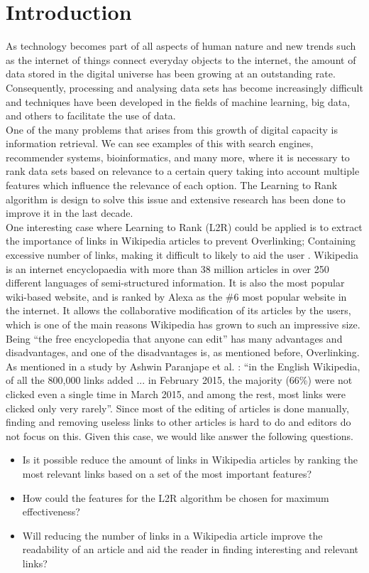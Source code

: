 \section{Introduction}

As technology becomes part of all aspects of human nature and new trends such as the internet of things connect everyday objects to the internet, the amount of data stored in the digital universe has been growing at an outstanding rate. Consequently, processing and analysing data sets has become increasingly difficult and techniques have been developed in the fields of machine learning, big data, and others to facilitate the use of data. \\
One of the many problems that arises from this growth of digital capacity is information retrieval. We can see examples of this with search engines, recommender systems, bioinformatics, and many more, where it is necessary to rank data sets based on relevance to a certain query taking into account multiple features which influence the relevance of each option. The Learning to Rank algorithm is design to solve this issue and extensive research has been done to improve it in the last decade. \\
One interesting case where Learning to Rank (L2R) could be applied is to extract the importance of links in Wikipedia articles to prevent Overlinking; Containing excessive number of links, making it difficult to likely to aid the user \cite{missing_links}. Wikipedia is an internet encyclopaedia with more than 38 million articles in over 250 different languages of semi-structured information. It is also the most popular wiki-based website, and is ranked by Alexa as the \#6 most popular website in the internet. It allows the collaborative modification of its articles by the users, which is one of the main reasons Wikipedia has grown to such an impressive size. \\
Being ``the free encyclopedia that anyone can edit'' has many advantages and disadvantages, and one of the disadvantages is, as mentioned before, Overlinking. As mentioned in a study by Ashwin Paranjape et al. \cite{paranjape}:  ``in the English Wikipedia, of all the 800,000 links added ... in February 2015, the majority (66\%) were not clicked even a single time in March 2015, and among the rest, most links were clicked only very rarely''. Since most of the editing of articles is done manually, finding and removing useless links to other articles is hard to do and editors do not focus on this. Given this case, we would like answer the following questions.

\begin{itemize}
\item Is it possible reduce the amount of links in Wikipedia articles by ranking the most relevant links based on a set of the most important features?
\item How could the features for the L2R algorithm be chosen for maximum effectiveness?
\item Will reducing the number of links in a Wikipedia article improve the readability of an article and aid the reader in finding interesting and relevant links?
\end{itemize}
